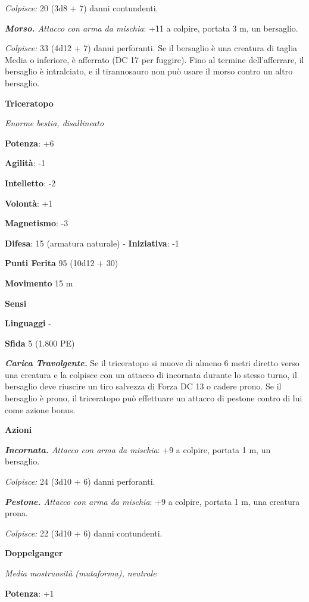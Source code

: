 \begin{multicols}{2}
\emph{Colpisce:} 20 (3d8 + 7) danni contundenti.

\emph{\textbf{Morso.} Attacco con arma da mischia}: +11 a colpire,
portata 3 m, un bersaglio.

\emph{Colpisce:} 33 (4d12 + 7) danni perforanti. Se il bersaglio è una
creatura di taglia Media o inferiore, è afferrato (DC 17 per fuggire).
Fino al termine dell'afferrare, il bersaglio è intralciato, e il
tirannosauro non può usare il morso contro un altro bersaglio.

\textbf{Triceratopo}

\emph{Enorme bestia, disallineato}

\textbf{Potenza}: +6

\textbf{Agilità}: -1

\textbf{Intelletto}: -2

\textbf{Volontà}: +1

\textbf{Magnetismo}: -3

\textbf{Difesa}: 15 (armatura naturale) - \textbf{Iniziativa}: -1

\textbf{Punti Ferita} 95 (10d12 + 30)

\textbf{Movimento} 15 m

\textbf{Sensi} 

\textbf{Linguaggi} -

\textbf{Sfida} 5 (1.800 PE)\smallskip

\emph{\textbf{Carica Travolgente.}} Se il triceratopo si muove di almeno
6 metri diretto verso una creatura e la colpisce con un attacco di
incornata durante lo stesso turno, il bersaglio deve riuscire un tiro
salvezza di Forza DC 13 o cadere prono. Se il bersaglio è prono, il
triceratopo può effettuare un attacco di pestone contro di lui come
azione bonus.

\smallskip\textbf{Azioni}

\emph{\textbf{Incornata.} Attacco con arma da mischia}: +9 a colpire,
portata 1 m, un bersaglio.

\emph{Colpisce:} 24 (3d10 + 6) danni perforanti.

\emph{\textbf{Pestone.} Attacco con arma da mischia}: +9 a colpire,
portata 1 m, una creatura prona.

\emph{Colpisce:} 22 (3d10 + 6) danni contundenti.



\textbf{Doppelganger}

\emph{Media mostruosità (mutaforma), neutrale}

\textbf{Potenza}: +1


\end{multicols}
